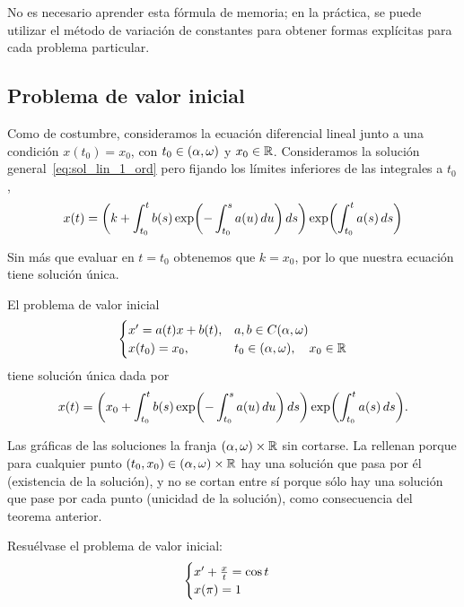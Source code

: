 \documentclass[../ecuaciones_diferenciales.tex]{subfiles}
\begin{document}
No es necesario aprender esta fórmula de memoria; en la práctica, se puede
utilizar el método de variación de constantes para obtener formas explícitas
para cada problema particular.

\subsection{Problema de valor inicial}

Como de costumbre, consideramos la ecuación diferencial lineal junto a una
condición \(x(t_0) = x_0\), con \(t_0 \in \openopen{\alpha}{\omega}\) y \(x_0 \in \mathbb{R}\).
Consideramos la solución general~\eqref{eq:sol_lin_1_ord} pero fijando los límites inferiores de las
integrales a \(t_0\),
\[x(t) = \parens{k + \int_{t_0}^t b(s) \expf{-\int_{t_0}^s a(u) \dif u} \dif s}
	\expf{\int_{t_0}^t a(s) \dif s}\]

Sin más que evaluar en \(t = t_0\) obtenemos que \(k = x_0\), por lo que
nuestra ecuación tiene solución única.

\begin{theorem}
	El problema de valor inicial
	\[\begin{cases}
			x' = a(t)x + b(t), & a, b \in C(\alpha, \omega) \\
			x(t_0) = x_0, 	  & t_0 \in (\alpha, \omega), \quad x_0 \in \mathbb{R}\end{cases}\]
	tiene solución única dada por
	\[x(t) =
		\parens{x_0 + \int_{t_0}^t b(s) \expf{-\int_{t_0}^s a(u) \dif u} \dif s}
		\expf{\int_{t_0}^t a(s) \dif s}.\]
\end{theorem}

Las gráficas de las soluciones  la franja
\(\openopen{\alpha}{\omega} \times \R\) sin cortarse. La rellenan porque para cualquier
punto \((t_0, x_0) \in \openopen{\alpha}{\omega} \times \R\) hay una solución que pasa
por él (existencia de la solución), y no se cortan entre sí porque sólo hay una
solución que pase por cada punto (unicidad de la solución), como consecuencia
del teorema anterior.

\begin{example}
	Resuélvase el problema de valor inicial:
	\[\begin{cases}
			x' + \frac{x}{t} = \cos t \\
			x(\pi) = 1\end{cases}\]
\end{example}
\end{document}

